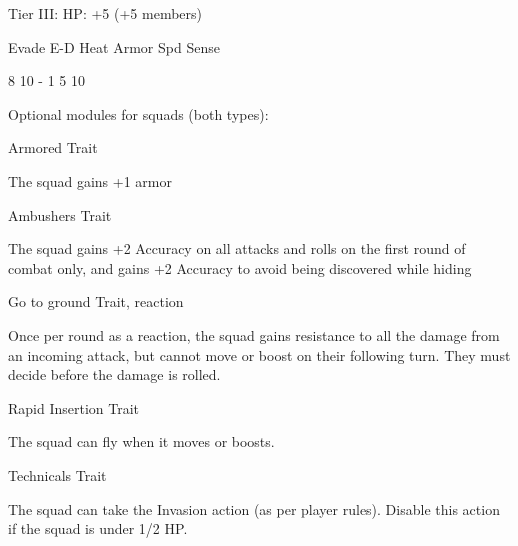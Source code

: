 Tier III:
HP: +5 (+5 members)


        Evade     E-D    Heat    Armor         Spd      Sense

        8         10     -        1            5         10

Optional modules for squads (both types):

Armored
Trait

The squad gains +1 armor


Ambushers
Trait

The squad gains +2 Accuracy on all attacks and rolls on the first round of combat only, and gains
+2 Accuracy to avoid being discovered while hiding


Go to ground
Trait, reaction

Once per round as a reaction, the squad gains resistance to all the damage from an incoming
attack, but cannot move or boost on their following turn. They must decide before the damage is
rolled.


Rapid Insertion
Trait

The squad can fly when it moves or boosts.


Technicals
Trait

The squad can take the Invasion action (as per player rules). Disable this action if the squad is
under 1/2 HP.


